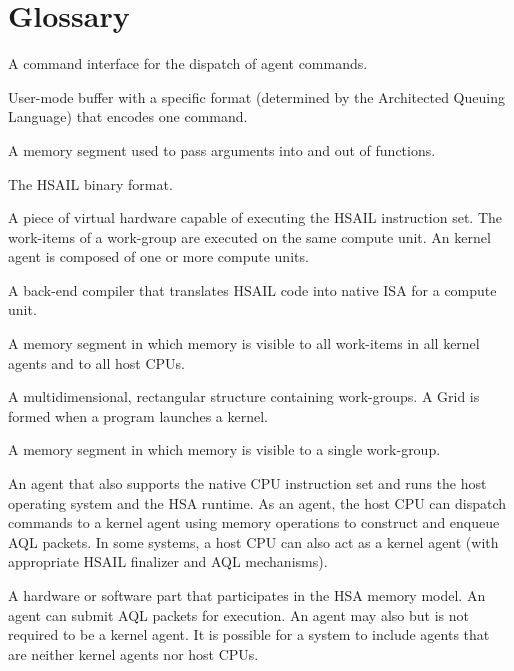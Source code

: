 \documentclass[oneside]{book}
\begin{document}
\chapter{Glossary}
\begin{description}[itemsep=5pt,leftmargin=0cm, labelindent=0cm]

\item[Architected Queuing Language (AQL)] A command interface for the dispatch
  of agent commands.

\item[AQL packet] User-mode buffer with a specific format (determined by the
  Architected Queuing Language) that encodes one command.

\item[Arg segment] A memory segment used to pass arguments into and out of
  functions.

\item[BRIG] The HSAIL binary format.

\item[Compute unit] A piece of virtual hardware capable of executing the HSAIL
  instruction set. The work-items of a work-group are executed on the same
  compute unit. An kernel agent is composed of one or more compute units.

\item[Finalizer] A back-end compiler that translates HSAIL code into native ISA
  for a compute unit.

\item[Global segment] A memory segment in which memory is visible to all
  work-items in all kernel agents and to all host CPUs.

\item[Grid] A multidimensional, rectangular structure containing work-groups. A
  Grid is formed when a program launches a kernel.

\item[Group segment] A memory segment in which memory is visible to a single
  work-group.

\item[Host CPU] An agent that also supports the native CPU instruction set
  and runs the host operating system and the HSA runtime. As an agent, the
  host CPU can dispatch commands to a kernel agent using memory operations to
  construct and enqueue AQL packets. In some systems, a host CPU can also act as
  a kernel agent (with appropriate HSAIL finalizer and AQL mechanisms).

\item[Agent] A hardware or software part that participates in the HSA
  memory model. An agent can submit AQL packets for execution. An agent
  may also but is not required to be a kernel agent. It is possible for a
  system to include agents that are neither kernel agents nor host CPUs.


\end{description}
\end{document}
